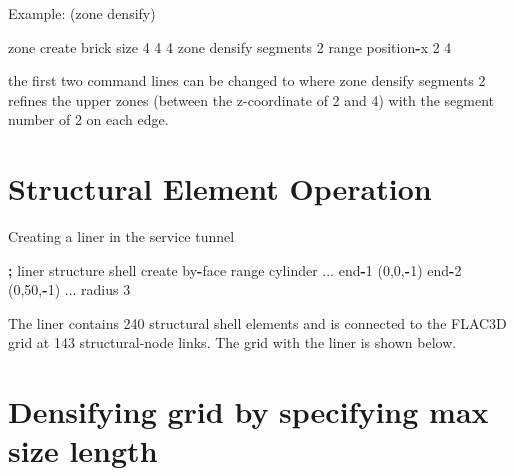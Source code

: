 \documentclass[a4paper, nobind]{templates/ociamthesis}
\newenvironment{Shaded}{\begin{snugshade}}{\end{snugshade}}
\newcommand{\BuiltInTok}[1]{#1}
\newcommand{\DecValTok}[1]{\textcolor[rgb]{0.00,0.00,0.81}{#1}}
\newcommand{\NormalTok}[1]{#1}
\newcommand{\OperatorTok}[1]{\textcolor[rgb]{0.81,0.36,0.00}{\textbf{#1}}}
\renewenvironment{Shaded}
{
  \vspace{10pt}%
  \begin{snugshade}%
}{%
  \end{snugshade}%
  \vspace{8pt}%
}
\begin{document}
Example: (zone densify)

\begin{Shaded}
\begin{Highlighting}[]
\NormalTok{zone create brick size }\DecValTok{4} \DecValTok{4} \DecValTok{4}
\NormalTok{zone densify segments }\DecValTok{2} \BuiltInTok{range}\NormalTok{ position}\OperatorTok{{-}}\NormalTok{x }\DecValTok{2} \DecValTok{4}
\end{Highlighting}
\end{Shaded}

the first two command lines can be changed to where zone densify
segments 2 refines the upper zones (between the z-coordinate of 2 and 4)
with the segment number of 2 on each edge.

\hypertarget{structural-element-operation}{%
\section{Structural Element Operation}\label{structural-element-operation}}

Creating a liner in the service tunnel

\begin{Shaded}
\begin{Highlighting}[]
\OperatorTok{;}\NormalTok{ liner}
\NormalTok{structure shell create by}\OperatorTok{{-}}\NormalTok{face }\BuiltInTok{range}\NormalTok{ cylinder ...}
\NormalTok{                                     end}\OperatorTok{{-}}\DecValTok{1}\NormalTok{ (}\DecValTok{0}\NormalTok{,}\DecValTok{0}\NormalTok{,}\OperatorTok{{-}}\DecValTok{1}\NormalTok{) end}\OperatorTok{{-}}\DecValTok{2}\NormalTok{ (}\DecValTok{0}\NormalTok{,}\DecValTok{50}\NormalTok{,}\OperatorTok{{-}}\DecValTok{1}\NormalTok{) ...}
\NormalTok{                                     radius }\DecValTok{3}
\end{Highlighting}
\end{Shaded}

The liner contains 240 structural shell elements and is connected to the
FLAC3D grid at 143 structural-node links. The grid with the liner is
shown below.

\hypertarget{densifying-grid-by-specifying-max-size-length}{%
\section{Densifying grid by specifying max size length}\label{densifying-grid-by-specifying-max-size-length}}
\end{document}
